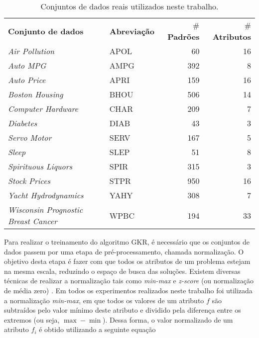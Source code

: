 \begin{table}[H]
    \caption{Conjuntos de dados reais utilizados neste trabalho.}
    \label{tab:real-datasets}
    \begin{center}
        \begin{tabular}{l@{\hskip 18pt}l@{\hskip 18pt}r@{\hskip 18pt}r}
            \hline\noalign{\smallskip}
            \textbf{Conjunto de dados} & \textbf{Abreviação} & \# \textbf{Padrões} & \# \textbf{Atributos}\\
            \noalign{\smallskip}
            \hline
            \noalign{\smallskip}
            \textit{Air Pollution} & APOL & 60 & 16 \\
            \textit{Auto MPG} & AMPG & 392 & 8 \\
            \textit{Auto Price} & APRI & 159 & 16 \\
            \textit{Boston Housing} & BHOU & 506 & 14 \\
            \textit{Computer Hardware} & CHAR & 209 & 7 \\
            \textit{Diabetes} & DIAB & 43 & 3 \\
            \textit{Servo Motor} & SERV & 167 & 5 \\
            \textit{Sleep} & SLEP & 51 & 8 \\
            \textit{Spirituous Liquors} & SPIR & 315 & 3 \\
            \textit{Stock Prices} & STPR & 950 & 16 \\
            \textit{Yacht Hydrodynamics} & YAHY & 308 & 7 \\
            \textit{Wisconsin Prognostic Breast Cancer} & WPBC & 194 & 33 \\
            \hline
        \end{tabular}
    \end{center}
    \begin{center}
    \end{center}
\end{table}

Para realizar o treinamento do algoritmo GKR, é necessário que os conjuntos de dados passem por uma etapa de pré-processamento, chamada normalização. O objetivo desta etapa é fazer com que todos os atributos de um problema estejam na mesma escala, reduzindo o espaço de busca das soluções. Existem diversas técnicas de realizar a normalização tais como \textit{min-max} e \textit{z-score} (ou normalização de média zero) \cite{han2011}. Em todos os experimentos realizados neste trabalho foi utilizada a normalização \textit{min-max}, em que todos os valores de um atributo $f$ são subtraídos pelo valor mínimo deste atributo e dividido pela diferença entre os extremos (ou seja, $\max-\min$). Dessa forma, o valor normalizado de um atributo $f_i$ é obtido utilizando a seguinte equação

